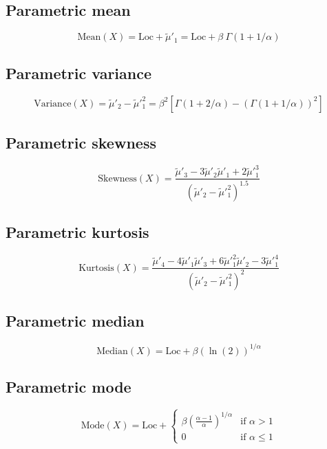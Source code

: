 \documentclass{article}
\begin{document}
\subsection{Parametric mean}
\begin{equation*} \mathrm{Mean}(X)=\text{Loc}+\tilde{\mu}'_{1}=\text{Loc}+\beta \ \Gamma(1+1/\alpha) \end{equation*}
\subsection{Parametric variance}
\begin{equation*} \mathrm{Variance}(X)=\tilde{\mu}'_{2}-\tilde{\mu}'^{2}_{1}=\beta^2\left[\Gamma\left(1+2/\alpha\right)-\left(\Gamma\left(1+1/\alpha\right)\right)^2\right] \end{equation*}
\subsection{Parametric skewness}
\begin{equation*} \mathrm{Skewness}(X)=\frac{\tilde{\mu}'_{3}-3\tilde{\mu}'_{2}\tilde{\mu}'_{1}+2\tilde{\mu}'^{3}_{1}}{(\tilde{\mu}'_{2}-\tilde{\mu}'^{2}_{1})^{1.5}} \end{equation*}
\subsection{Parametric kurtosis}
\begin{equation*} \mathrm{Kurtosis}(X)=\frac{\tilde{\mu}'_{4}-4\tilde{\mu}'_{1}\tilde{\mu}'_{3}+6\tilde{\mu}'^{2}_{1}\tilde{\mu}'_{2}-3\tilde{\mu}'^{4}_{1}}{(\tilde{\mu}'_{2}-\tilde{\mu}'^{2}_{1})^{2}} \end{equation*}
\subsection{Parametric median}
\begin{equation*} \mathrm{Median}(X)=\text{Loc}+\beta(\ln(2))^{1/\alpha} \end{equation*}
\subsection{Parametric mode}
\begin{equation*} \mathrm{Mode}(X)=\text{Loc}+\left\{\begin{array}{cl} \beta\left(\frac{\alpha-1}{\alpha}\right)^{1/\alpha} & \text{if }\alpha>1\\ 0 & \text{if } \alpha\leq 1 \end{array} \right. \end{equation*}
\end{document}
